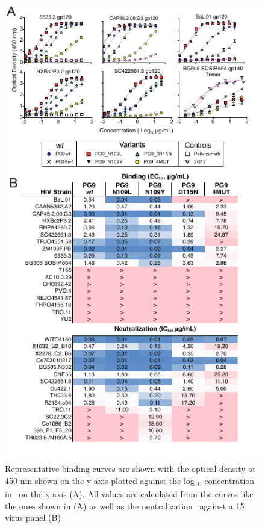 \begin{figure}[!t]
   \centering
   \includegraphics{images/chapter4/figure4_4.pdf} %
   \caption[Experimental Analysis of PG9 Variants]{Representative binding curves are shown with the optical density at 450 nm shown on the y-axis plotted against the log\textsubscript{10} concentration in \mcml~on the x-axis (A). All \ec values are calculated from the curves like the ones shown in (A) as well as the neutralization \ic~against a 15 virus panel (B)}
   \label{fig:figure4_4}
\end{figure}


